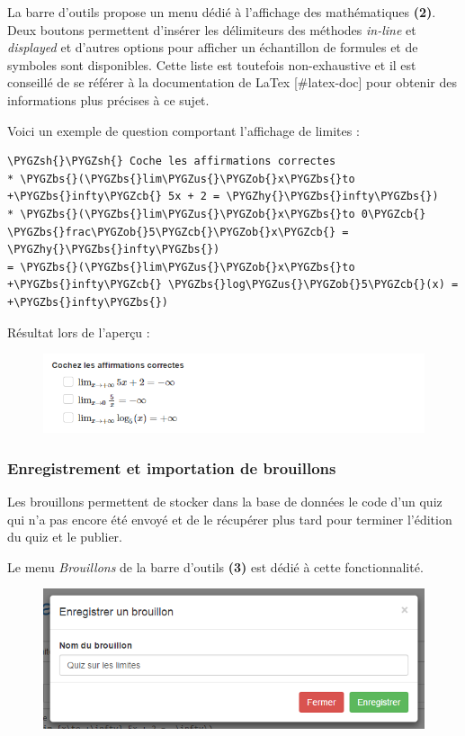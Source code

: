 \documentclass[a4,10pt,french]{sphinxmanual}
\def\PYGZbs{\char`\\}
\def\PYGZus{\char`\_}
\def\PYGZob{\char`\{}
\def\PYGZcb{\char`\}}
\def\PYGZsh{\char`\#}
\def\PYGZhy{\char`\-}
\begin{document}
La barre d'outils propose un menu dédié à l'affichage des mathématiques \textbf{(2)}. Deux boutons permettent d'insérer les délimiteurs des méthodes \emph{in-line} et \emph{displayed} et d'autres options pour afficher un échantillon de formules et de symboles sont disponibles. Cette liste est toutefois non-exhaustive et il est conseillé de se référer à la documentation de LaTex {[}\#latex-doc{]} pour obtenir des informations plus précises à ce sujet.

Voici un exemple de question comportant l'affichage de limites :

\begin{Verbatim}[commandchars=\\\{\}]
\PYGZsh{}\PYGZsh{} Coche les affirmations correctes
* \PYGZbs{}(\PYGZbs{}lim\PYGZus{}\PYGZob{}x\PYGZbs{}to +\PYGZbs{}infty\PYGZcb{} 5x + 2 = \PYGZhy{}\PYGZbs{}infty\PYGZbs{})
* \PYGZbs{}(\PYGZbs{}lim\PYGZus{}\PYGZob{}x\PYGZbs{}to 0\PYGZcb{} \PYGZbs{}frac\PYGZob{}5\PYGZcb{}\PYGZob{}x\PYGZcb{} = \PYGZhy{}\PYGZbs{}infty\PYGZbs{})
= \PYGZbs{}(\PYGZbs{}lim\PYGZus{}\PYGZob{}x\PYGZbs{}to +\PYGZbs{}infty\PYGZcb{} \PYGZbs{}log\PYGZus{}\PYGZob{}5\PYGZcb{}(x) = +\PYGZbs{}infty\PYGZbs{})
\end{Verbatim}

Résultat lors de l'aperçu :
\begin{figure}[htbp]
\centering

\includegraphics{checkbox.png}
\end{figure}


\subsubsection{Enregistrement et importation de brouillons}
\label{doc-user:enregistrement-et-importation-de-brouillons}
Les brouillons permettent de stocker dans la base de données le code d'un quiz qui n'a pas encore été envoyé et de le récupérer plus tard pour terminer l'édition du quiz et le publier.

Le menu \emph{Brouillons} de la barre d'outils \textbf{(3)} est dédié à cette fonctionnalité.
\begin{figure}[htbp]
\centering

\includegraphics{draft-save.png}
\end{figure}
\end{document}
